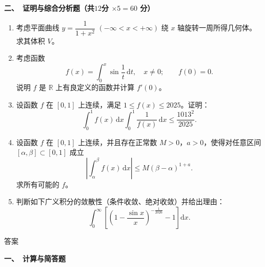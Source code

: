 \bigskip

\textbf{二、\ 证明与综合分析题（共$12$分 $\times 5 = 60$ 分）}

\begin{enumerate}
    \item 考虑平面曲线 $y = \dfrac{1}{1 + x^2}$ $(-\infty < x < +\infty)$ 绕 $x$ 轴旋转一周所得几何体。求其体积 $V$。

    \item 考虑函数
    \[
    f(x) = \int_0^x \sin \frac{1}{t}\,\mathrm{d}t, \quad x \neq 0; \qquad f(0) = 0.
    \]
    说明 $f$ 是 $\mathbb{R}$ 上有良定义的函数并计算 $f'(0)$。

    \item 设函数 $f$ 在 $[0,1]$ 上连续，满足 $1 \leq f(x) \leq 2025$。证明：
    \[
    \int_0^1 f(x)\,\mathrm{d}x \int_0^1 \frac{1}{f(x)}\,\mathrm{d}x \leq \frac{1013^2}{2025}.
    \]

    \item 设函数 $f$ 在 $[0,1]$ 上连续，并且存在正常数 $M > 0$，$a > 0$，使得对任意区间 $[\alpha, \beta] \subset [0,1]$ 成立
    \[
    \left|\int_\alpha^\beta f(x)\,\mathrm{d}x\right| \leq M(\beta - \alpha)^{1 + a}.
    \]
    求所有可能的 $f$。

    \item 判断如下广义积分的敛散性（条件收敛、绝对收敛）并给出理由：
    \[
    \int_0^\infty \left[ \left(1 - \frac{\sin x}{x}\right)^{-\frac{1}{2026}} - 1 \right] \mathrm{d}x.
    \]
\end{enumerate}

答案

\bigskip

\textbf{一、\ 计算与简答题}

